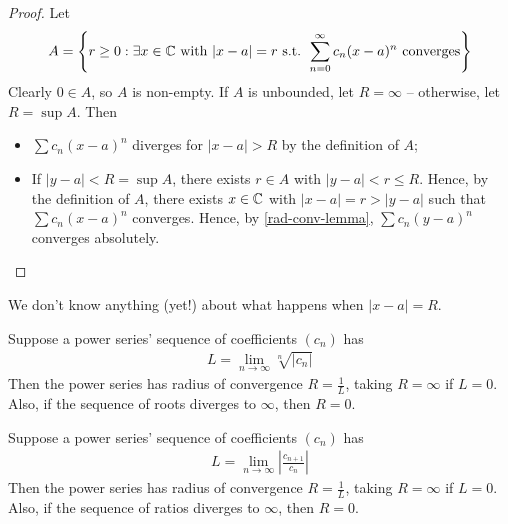 \documentclass{../../template/note}
\begin{document}
    \begin{proof}
        Let
        \begin{align*}
            A = \left\{r \geq 0: \exists x \in \mathbb C \text{ with } |x-a| = r \text{ s.t. } \sum_{n=0}^\infty c_n(x-a)^n \text{ converges}\right\}
        \end{align*}
        Clearly \(0 \in A\), so \(A\) is non-empty. If \(A\) is unbounded, let \(R = \infty\) -- otherwise, let \(R = \sup A\). Then
        \begin{itemize}
            \item \(\sum c_n (x-a)^n\) diverges for \(|x-a| > R\) by the definition of \(A\);
            \item If \(|y-a| < R = \sup A\), there exists \(r \in A\) with \(|y-a| < r \leq R\). Hence, by the definition of \(A\), there exists \(x \in \mathbb C\) with \(|x-a| = r > |y-a|\) such that \(\sum c_n(x-a)^n\) converges. Hence, by \cref{rad-conv-lemma}, \(\sum c_n (y-a)^n\) converges absolutely.
        \end{itemize}
    \end{proof}
    
    \begin{remark*}
        We don't know anything (yet!) about what happens when \(|x-a| = R\).
    \end{remark*}
    
    \begin{proposition}
        Suppose a power series' sequence of coefficients \((c_n)\) has
        \begin{align*}
            L = \lim_{n \to \infty} \sqrt[n]{|c_n|}
        \end{align*}
        Then the power series has radius of convergence \(R = \frac 1 L\), taking \(R = \infty\) if \(L = 0\). Also, if the sequence of roots diverges to \(\infty\), then \(R = 0\).        
    \end{proposition}
    
    \begin{proposition}
        Suppose a power series' sequence of coefficients \((c_n)\) has
        \begin{align*}
            L = \lim_{n \to \infty} \left|\frac{c_{n+1}}{c_n}\right|
        \end{align*}
        Then the power series has radius of convergence \(R = \frac 1 L\), taking \(R = \infty\) if \(L = 0\). Also, if the sequence of ratios diverges to \(\infty\), then \(R = 0\).         
    \end{proposition}
    
\end{document}
